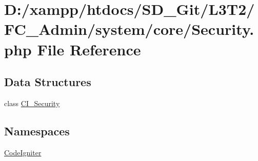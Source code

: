\hypertarget{_admin_2system_2core_2_security_8php}{}\section{D\+:/xampp/htdocs/\+S\+D\+\_\+\+Git/\+L3\+T2/\+F\+C\+\_\+\+Admin/system/core/\+Security.php File Reference}
\label{_admin_2system_2core_2_security_8php}
\subsection*{Data Structures}
\begin{DoxyCompactItemize}
\item 
class \hyperlink{class_c_i___security}{C\+I\+\_\+\+Security}
\end{DoxyCompactItemize}
\subsection*{Namespaces}
\begin{DoxyCompactItemize}
\item 
 \hyperlink{namespace_code_igniter}{Code\+Igniter}
\end{DoxyCompactItemize}
